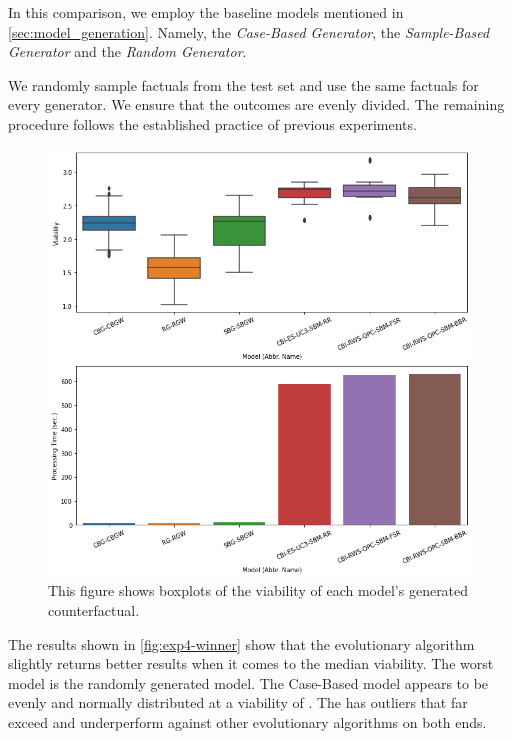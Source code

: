 \documentclass[./../../paper.tex]{subfiles}
\begin{document}
In this comparison, we employ the baseline models mentioned in \autoref{sec:model_generation}. Namely, the \emph{Case-Based Generator}, the \emph{Sample-Based Generator} and the \emph{Random Generator}. 

We randomly sample  factuals from the test set and use the same factuals for every generator. We ensure that the outcomes are evenly divided. The remaining procedure follows the established practice of previous experiments.

\begin{figure}[htbp]
    \centering
    \includegraphics[width=\textwidth]{figures/generated/exp4_winner_overall.png}
    \caption{This figure shows boxplots of the viability of each model's generated counterfactual.}
    \label{fig:exp4-winner}
\end{figure}

\noindent The results shown in \autoref{fig:exp4-winner} show that the evolutionary algorithm  slightly returns better results when it comes to the median viability. The worst model is the randomly generated model. The Case-Based model appears to be evenly and normally distributed at a viability of . The  has outliers that far exceed and underperform against other evolutionary algorithms on both ends.  
\end{document}
